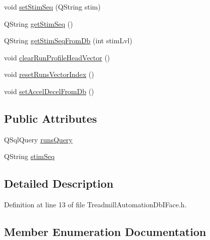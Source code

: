 \begin{DoxyCompactItemize}
\item 
void \hyperlink{class_treadmill_automation_db_i_face_a3a90027f63e3291ea36f4cc9c79dd896}{set\+Stim\+Seq} (Q\+String stim)
\item 
Q\+String \hyperlink{class_treadmill_automation_db_i_face_aba0e5950a23549b5d042368d9e651790}{get\+Stim\+Seq} ()
\item 
Q\+String \hyperlink{class_treadmill_automation_db_i_face_a97a851c99b7ca8ee21a908d768168052}{get\+Stim\+Seq\+From\+Db} (int stim\+Lvl)
\item 
void \hyperlink{class_treadmill_automation_db_i_face_a2f0bbbf8e3a2843c296471175f879bde}{clear\+Run\+Profile\+Head\+Vector} ()
\item 
void \hyperlink{class_treadmill_automation_db_i_face_a2e1eb7dbfcfd5f83b841d9f925df5b56}{reset\+Runs\+Vector\+Index} ()
\item 
void \hyperlink{class_treadmill_automation_db_i_face_ab805c20ce5f736562c3769cdf7a7661b}{set\+Accel\+Decel\+From\+Db} ()
\end{DoxyCompactItemize}
\subsection*{Public Attributes}
\begin{DoxyCompactItemize}
\item 
Q\+Sql\+Query \hyperlink{class_treadmill_automation_db_i_face_a449bbbbb5aa67ba7dfdb993f5033251a}{runs\+Query}
\item 
Q\+String \hyperlink{class_treadmill_automation_db_i_face_a080ba221870f3fa6222afd2b9df625a7}{stim\+Seq}
\end{DoxyCompactItemize}


\subsection{Detailed Description}


Definition at line 13 of file Treadmill\+Automation\+Db\+I\+Face.\+h.



\subsection{Member Enumeration Documentation}
\mbox{\label{class_treadmill_automation_db_i_face_a65748311e422de400d4fedfadaf63b62}} 
